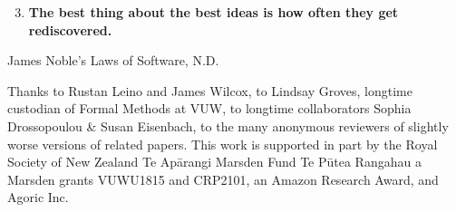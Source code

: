 \documentclass[sigplan,review,screen,balance,anonymous]{acmart}
\begin{document}
\begin{teaserfigure}
\begin{center}
\begin{minipage}{0.8\textwidth}
  {\Large
  \begin{enumerate}
  \setcounter{enumi}{2}
  \item \textbf{The best thing about the best ideas is how often they get rediscovered.}
    \end{enumerate}}
  \begin{flushright}
    James Noble's Laws of Software, N.D. 
  \end{flushright}
  \end{minipage}
  \vspace*{5mm}
\end{center}
\end{teaserfigure}





\maketitle
%
%
%



%




\balance




\begin{acks}
Thanks to Rustan Leino and James Wilcox, 
to Lindsay Groves, longtime custodian of Formal Methods at VUW,
to longtime collaborators Sophia Drossopoulou \& Susan Eisenbach,
to the many anonymous reviewers of slightly worse versions of related papers.
%
%
This work is supported in part by the Royal Society of New Zealand Te Ap\={a}rangi  Marsden Fund Te P\={u}tea Rangahau a Marsden grants VUWU1815 and CRP2101, an Amazon Research Award, and Agoric Inc.
\end{acks}
\end{document}
